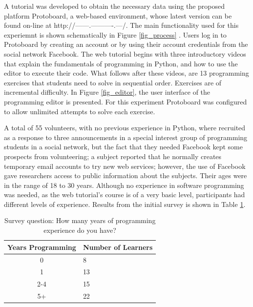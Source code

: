 \documentclass[a4paper]{llncs}
\begin{document}
A tutorial was developed to
obtain the necessary data using the proposed platform Protoboard, a web-based environment,
whose latest version can be found on-line at 
http://------.----------.---/. 
The main functionality  used for this experiemnt is
shown schematically in Figure \ref{fig_process} . %
Users log in to 
Protoboard  by creating an account or by using their account credentials from the
social network Facebook. The web tutorial begins with three introductory videos that explain
the fundamentals of programming in Python, and how to use the editor to
execute their code. What follows after these videos, are 13 programming
exercises that students need to solve in sequential order. Exercises are of
incremental difficulty. In Figure \ref{fig_editor}, %
the user interface of the programming editor is
presented. For this experiment Protoboard was configured to allow unlimited
attempts to solve each exercise. 

A total of 55 volunteers, with no previous experience in Python, where recruited
as a response to three announcements in a special interest group of programming
students in a social network, but the fact that they needed Facebook kept some prospects from
volunteering; a subject reported that he normally creates temporary email
accounts to try new web services; however, the use of Facebook gave researchers access to public
information about the subjects. Their ages were in the range of 18 to
30 years. Although no experience in software programming was needed, as the
web tutorial's course is of a very basic level, participants had
different levels of experience. Results from
the initial survey is shown in Table \ref{tab_results}. %
\begin{table}[!t]
\centering
\caption{ Survey question: How many years of programming experience do you have? }
\label{tab_results}
    \begin{tabular}{ | c | l | }
    \hline
    Years Programming          & Number of Learners \\
    \hline
   		0   &  8 \\
    \hline
    	1   &  13\\
    \hline
    	2-4  & 15\\
    \hline
    	5+   & 22\\
    \hline
    \end{tabular}

\end{table}
\end{document}
